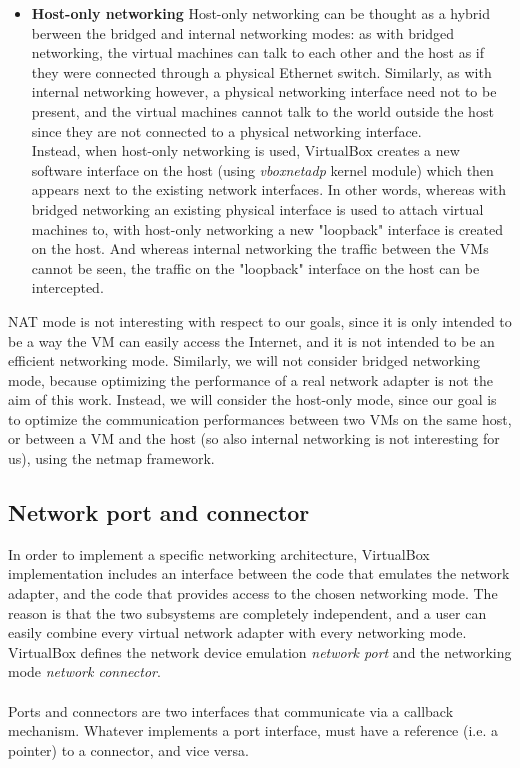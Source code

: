 \documentclass[a4paper, 12pt, titlepage]{report}
\begin{document}
\begin{itemize}
\item \textbf{Host-only networking} Host-only networking can be thought as a hybrid berween the bridged and internal networking modes: as with bridged networking, the virtual machines can talk to each other and the host as if they were connected through a physical Ethernet switch. Similarly, as with internal networking however, a physical networking interface need not to be present, and the virtual machines cannot talk to the world outside the host since they are not connected to a physical networking interface.
\\
Instead, when host-only networking is used, VirtualBox creates a new software interface on the host (using \textit{vboxnetadp} kernel module) which then appears next to the existing network interfaces. In other words, whereas with bridged networking an existing physical interface is used to attach virtual machines to, with host-only networking a new "loopback" interface is created on the host. And whereas internal networking the traffic between the VMs cannot be seen, the traffic on the "loopback" interface on the host can be intercepted.
\end{itemize}
NAT mode is not interesting with respect to our goals, since it is only intended to be a way the VM can easily access the Internet, and it is not intended to be an efficient networking mode. Similarly, we will not consider bridged networking mode, because optimizing the performance of a real network adapter is not the aim of this work. Instead, we will consider the host-only mode, since our goal is to optimize the communication performances between two VMs on the same host, or between a VM and the host (so also internal networking is not interesting for us), using the netmap framework.

\subsection{Network port and connector} \label{subsec:port_conn}
In order to implement a specific networking architecture, VirtualBox implementation includes an interface between the code that emulates the network adapter, and the code that provides access to the chosen networking mode. The reason is that the two subsystems are completely independent, and a user can easily combine every virtual network adapter with every networking mode.
\\
VirtualBox defines the network device emulation \textit{network port} and the networking mode \textit{network connector}.
\\
\\
Ports and connectors are two interfaces that communicate via a callback mechanism. Whatever implements a port interface, must have a reference (i.e. a pointer) to a connector, and vice versa.
\end{document}
